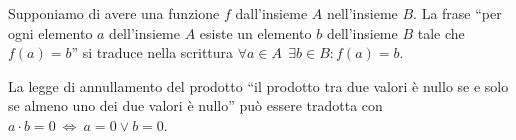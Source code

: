 \begin{exrig}
 \begin{esempio}
 Supponiamo di avere una funzione $f$ dall'insieme $A$ nell'insieme $B$. La frase ``per ogni elemento $a$ dell'insieme $A$ esiste un elemento $b$ dell'insieme $B$ tale che $f(a)=b$'' si traduce nella scrittura
$\forall a\in A\:\:\exists b \in B : f(a)=b$. 
 \end{esempio}
 
 \begin{esempio}
 La legge di annullamento del prodotto ``il prodotto tra due valori è nullo se e solo se almeno uno dei due valori è nullo'' può essere tradotta con
 $a\cdot b = 0 \:\Leftrightarrow\: a=0 \vee b=0$.

 \end{esempio}
\end{exrig}

\cleardoublepage

